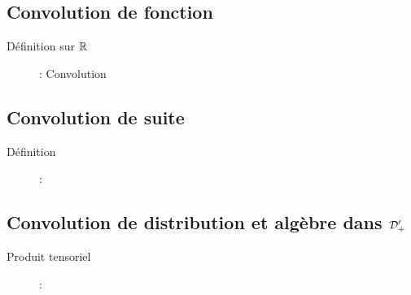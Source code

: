 \subsection{Convolution de fonction}
\begin{description}
\item[Définition sur $\mathbb{R}$] : Convolution
\end{description}

\subsection{Convolution de suite}
\begin{description}
\item[Définition] : 
\end{description}

\subsection{Convolution de distribution et algèbre dans $\mathcal{D}'_+$}
\begin{description}
\item[Produit tensoriel] : 
\end{description}
